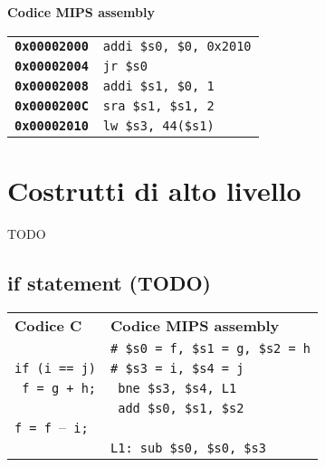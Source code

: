 \documentclass[../main.tex]{subfiles}
\begin{document}
\noindent
\textbf{Codice MIPS assembly} \\
\begin{table}[h!]
    \vspace*{-5mm}
    \setlength{\tabcolsep}{18pt}
    \begin{tabular}{ l l }
        \textbf{\texttt{0x00002000}} & \texttt{addi \$s0, \$0, 0x2010} \\
        \textbf{\texttt{0x00002004}} & \texttt{jr \$s0} \\
        \textbf{\texttt{0x00002008}} & \texttt{addi \$s1, \$0, 1} \\
        \textbf{\texttt{0x0000200C}} & \texttt{sra \$s1, \$s1, 2} \\
        \textbf{\texttt{0x00002010}} & \texttt{lw \$s3, 44(\$s1)} \\
    \end{tabular}
\end{table}

\section{Costrutti di alto livello}
TODO

\subsection{if statement (TODO)}
\begin{tabular}{ p{7cm} p{7cm} }
    \textbf{Codice C} & \textbf{Codice MIPS assembly} \\
    & \texttt{\# \$s0 = f, \$s1 = g, \$s2 = h} \\
	\texttt{if (i == j)} & \texttt{\# \$s3 = i, \$s4 = j} \\
    \texttt{ \hspace*{0cm} f = g + h;} & \texttt{ \hspace*{0cm} bne \$s3, \$s4, L1} \\
    & \texttt{ \hspace*{0cm} add \$s0, \$s1, \$s2} \\
    \texttt{f = f $–$ i;} \\
    & \texttt{L1: sub \$s0, \$s0, \$s3} \\
\end{tabular}
\end{document}
